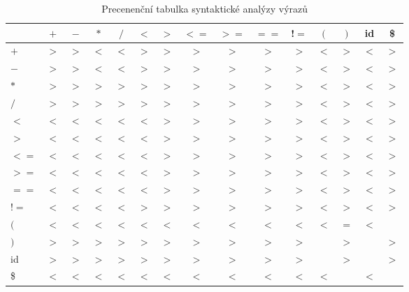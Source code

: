 \documentclass[a4paper, 11pt, titlepage]{article}
\begin{document}
\begin{table}[h]
	\begin{center}
	\begin{tabular}{l | c c c c c c c c c c c c c c}
			  & $+$ & $-$ & $*$ & $/$ & $<$ & $>$ & $<=$& $>=$& $==$ & !$=$ &  $($   &  $)$   &  id  &    \$ \\ \hline
		$+$   & $>$ & $>$ & $<$ & $<$ & $>$ & $>$ & $>$ & $>$ & $>$  & $>$  & $<$  & $>$  & $<$  & $>$ \\
		$-$   & $>$ & $>$ & $<$ & $<$ & $>$ & $>$ & $>$ & $>$ & $>$  & $>$  & $<$  & $>$  & $<$  & $>$ \\
		$*$   & $>$ & $>$ & $>$ & $>$ & $>$ & $>$ & $>$ & $>$ & $>$  & $>$  & $<$  & $>$  & $<$  & $>$ \\
		$/$   & $>$ & $>$ & $>$ & $>$ & $>$ & $>$ & $>$ & $>$ & $>$  & $>$  & $<$  & $>$  & $<$  & $>$ \\
		$<$   & $<$ & $<$ & $<$ & $<$ & $<$ & $>$ & $>$ & $>$ & $>$  & $>$  & $<$  & $>$  & $<$  & $>$ \\
		$>$   & $<$ & $<$ & $<$ & $<$ & $<$ & $>$ & $>$ & $>$ & $>$  & $>$  & $<$  & $>$  & $<$  & $>$ \\
		$<=$  & $<$ & $<$ & $<$ & $<$ & $<$ & $>$ & $>$ & $>$ & $>$  & $>$  & $<$  & $>$  & $<$  & $>$ \\
		$>=$  & $<$ & $<$ & $<$ & $<$ & $<$ & $>$ & $>$ & $>$ & $>$  & $>$  & $<$  & $>$  & $<$  & $>$ \\
		$==$  & $<$ & $<$ & $<$ & $<$ & $<$ & $>$ & $>$ & $>$ & $>$  & $>$  & $<$  & $>$  & $<$  & $>$ \\
		!$=$  & $<$ & $<$ & $<$ & $<$ & $>$ & $>$ & $>$ & $>$ & $>$  & $>$  & $<$  & $>$  & $<$  & $>$ \\
		$($   & $<$ & $<$ & $<$ & $<$ & $<$ & $<$ & $<$ & $<$ & $<$  & $<$  & $<$  & $=$  & $<$  &     \\
		$)$   & $>$ & $>$ & $>$ & $>$ & $>$ & $>$ & $>$ & $>$ & $>$  & $>$  &      & $>$  &      & $>$ \\
		id    & $>$ & $>$ & $>$ & $>$ & $>$ & $>$ & $>$ & $>$ & $>$  & $>$  &      & $>$  &      & $>$ \\
		\$    & $<$ & $<$ & $<$ & $<$ & $<$ & $<$ & $<$ & $<$ & $<$  & $<$  & $<$  &      & $<$  &     \\ \hline
	\end{tabular}
	\caption{Precenenční tabulka syntaktické analýzy výrazů}
	\label{table_2:PA}
	\end{center}
\end{table}
\end{document}
